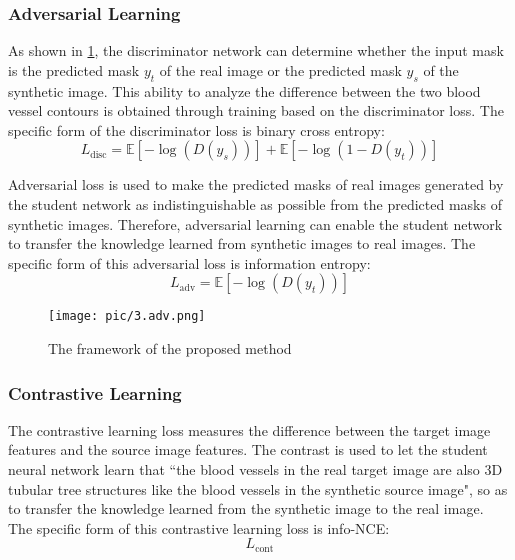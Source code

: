 
\subsubsection{Adversarial Learning}
As shown in \cref{fig:Adversarial}, the discriminator network can determine whether the input mask is the predicted mask $y_t$ of the real image or the predicted mask $y_s$ of the synthetic image. This ability to analyze the difference between the two blood vessel contours is obtained through training based on the discriminator loss. The specific form of the discriminator loss is binary cross entropy:
\begin{equation}
L_{\text{disc}} = \mathbb{E}[-\log(D(y_s))] + \mathbb{E}[-\log(1 - D(y_t))]
\end{equation}

Adversarial loss is used to make the predicted masks of real images generated by the student network as indistinguishable as possible from the predicted masks of synthetic images. Therefore, adversarial learning can enable the student network to transfer the knowledge learned from synthetic images to real images. The specific form of this adversarial loss is information entropy:
\begin{equation}
L_{\text{adv}} = \mathbb{E}[-\log(D(y_t))]
\end{equation}

\begin{figure}[htbp]
  \centering
  \texttt{[image: pic/3.adv.png]}
  \caption{The framework of the proposed method}
  \label{fig:Adversarial}
\end{figure}


\subsubsection{Contrastive Learning}
The contrastive learning loss measures the difference between the target image features and the source image features. The contrast is used to let the student neural network learn that ``the blood vessels in the real target image are also 3D tubular tree structures like the blood vessels in the synthetic source image", so as to transfer the knowledge learned from the synthetic image to the real image. The specific form of this contrastive learning loss is info-NCE:
\begin{equation}
  L_{\text{cont}}
\end{equation}

